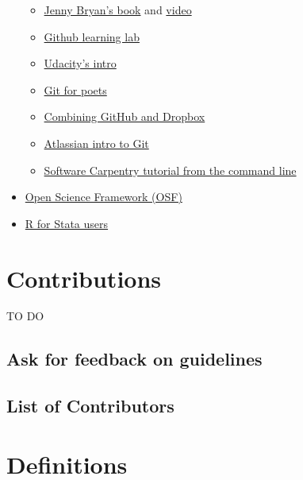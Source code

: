 \documentclass[]{book}
\providecommand{\tightlist}{%
  \setlength{\itemsep}{0pt}\setlength{\parskip}{0pt}}
\begin{document}
\begin{itemize}
  \begin{itemize}
  \tightlist
  \item
    \href{https://happygitwithr.com}{Jenny Bryan's book} and \href{https://www.rstudio.com/resources/videos/happy-git-and-gihub-for-the-user-tutorial/}{video}\\
  \item
    \href{https://lab.github.com/}{Github learning lab}
  \item
    \href{https://www.udacity.com/course/how-to-use-git-and-github--ud775}{Udacity's intro}\\
  \item
    \href{https://www.youtube.com/playlist?list=PLRqwX-V7Uu6ZF9C0YMKuns9sLDzK6zoiV}{Git for poets}\\
  \item
    \href{https://github.com/kbjarkefur/GitHubDropBox}{Combining GitHub and Dropbox}\\
  \item
    \href{https://www.atlassian.com/git/tutorials}{Atlassian intro to Git}
  \item
    \href{https://swcarpentry.github.io/git-novice/}{Software Carpentry tutorial from the command line}
  \end{itemize}
\item
  \href{https://osf.io}{Open Science Framework (OSF)}
\item
  \href{https://github.com/hblackburn/R4Econ/blob/master/Resources.md}{R for Stata users}
\end{itemize}

\hypertarget{contributions}{%
\chapter{Contributions}\label{contributions}}

TO DO

\hypertarget{ask-for-feedback-on-guidelines}{%
\section{Ask for feedback on guidelines}\label{ask-for-feedback-on-guidelines}}

\hypertarget{list-of-contributors}{%
\section{List of Contributors}\label{list-of-contributors}}

\hypertarget{definitions}{%
\chapter{Definitions}\label{definitions}}
\end{document}
